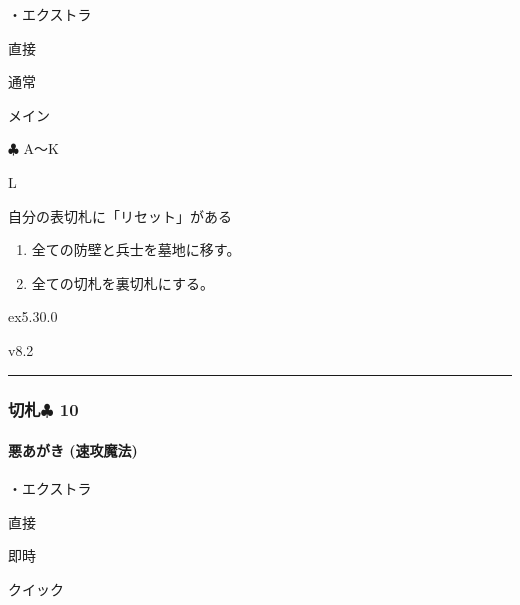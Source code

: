 \documentclass[letterpaper,10pt,dvipdfmx]{sphinxmanual}
\begin{document}
\sphinxAtStartPar
・エクストラ

\sphinxAtStartPar
{} 直接

\sphinxAtStartPar
{} 通常

\sphinxAtStartPar
{} メイン

\sphinxAtStartPar
{} {\normalsize $\clubsuit$} A〜K

\sphinxAtStartPar
{} L

\sphinxAtStartPar
{}

\sphinxAtStartPar
自分の表切札に「リセット」がある

\sphinxAtStartPar
{}
\begin{enumerate}
%
\item {} 
\sphinxAtStartPar
全ての防壁と兵士を墓地に移す。

\item {} 
\sphinxAtStartPar
全ての切札を裏切札にする。

\end{enumerate}

\sphinxAtStartPar
{}  ex5.30.0

\sphinxAtStartPar
{}  v8.2


\bigskip\hrule\bigskip



\subsubsection{切札{\normalsize $\clubsuit$} 10}
\label{\detokenize{auto/frameActionlist:id78}}

\paragraph{悪あがき (速攻魔法)}
\label{\detokenize{auto/frameActionlist:act-lastditch}}\label{\detokenize{auto/frameActionlist:id79}}
\sphinxAtStartPar
{}

\sphinxAtStartPar
・エクストラ

\sphinxAtStartPar
{} 直接

\sphinxAtStartPar
{} 即時

\sphinxAtStartPar
{} クイック
\end{document}
